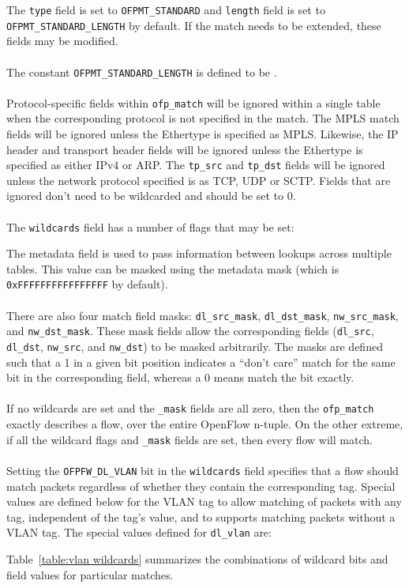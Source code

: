 
The \verb|type| field is set to \verb|OFPMT_STANDARD| and \verb|length| field is set to \verb|OFPMT_STANDARD_LENGTH| by default. If the match needs to be extended, these fields may be modified.
\\\\
The constant \verb|OFPMT_STANDARD_LENGTH| is defined to be .
\\\\
Protocol-specific fields within \verb|ofp_match| will be ignored within a single table when the corresponding protocol is not specified in the match. The MPLS match fields will be ignored unless the Ethertype is specified as MPLS. Likewise, the IP header and transport header fields will be ignored unless the Ethertype is specified as either IPv4 or ARP. The \verb|tp_src| and \verb|tp_dst| fields will be ignored unless the network protocol specified is as TCP, UDP or SCTP. Fields that are ignored don't need to be wildcarded and should be set to 0.
\\\\
The \verb|wildcards| field has a number of flags that may be set:



The metadata field is used to pass information between lookups across multiple tables. This value can be masked using the metadata mask (which is \verb|0xFFFFFFFFFFFFFFFF| by default).
\\\\
There are also four match field masks: \verb|dl_src_mask|, \verb|dl_dst_mask|, \verb|nw_src_mask|, and \verb|nw_dst_mask|. These mask fields allow the corresponding fields (\verb|dl_src|, \verb|dl_dst|, \verb|nw_src|, and \verb|nw_dst|) to be masked arbitrarily. The masks are defined such that a 1 in a given bit position indicates a ``don't care'' match for the same bit in the corresponding field, whereas a 0 means match the bit exactly.
\\\\
If no wildcards are set and the \verb|_mask| fields are all zero, then the \verb|ofp_match| exactly describes a flow, over the entire OpenFlow n-tuple.  On the other extreme, if all the wildcard flags and \verb|_mask| fields are set, then every flow will match.
\\\\
Setting the \verb|OFPFW_DL_VLAN| bit in the \verb|wildcards| field specifies that a flow should match packets regardless of whether they contain the corresponding tag. Special values are defined below for the VLAN tag to allow matching of packets with any tag, independent of the tag's value, and to supports matching packets without a VLAN tag. The special values defined for \verb|dl_vlan| are:

Table~\ref{table:vlan wildcards} summarizes the combinations of wildcard bits and field values for particular matches.

